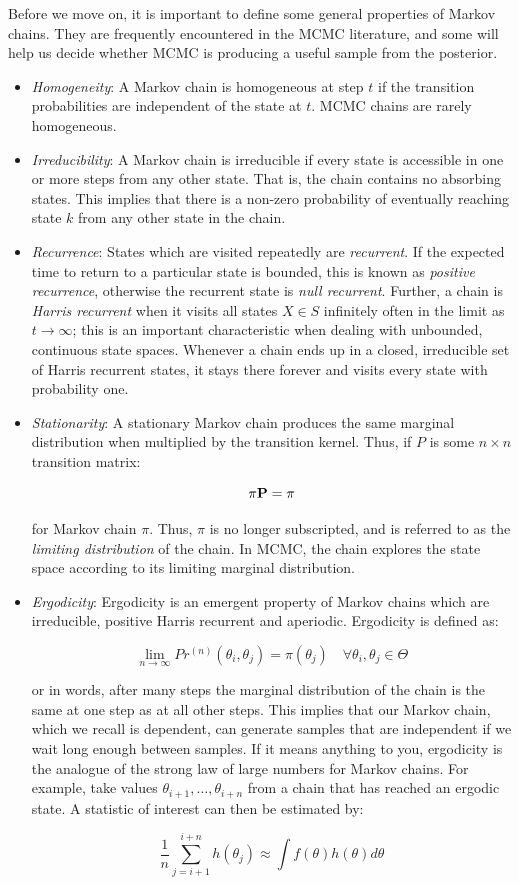 Before we move on, it is important to define some general properties of Markov chains. They are frequently encountered in the MCMC literature, and some will help us decide whether MCMC is producing a useful sample from the posterior.

\begin{itemize}
\item \emph{Homogeneity}: A Markov chain is homogeneous at step $t$ if the transition probabilities are independent of the state at $t$. MCMC chains are rarely homogeneous.
\item \emph{Irreducibility}: A Markov chain is irreducible if every state is accessible in one or more steps from any other state. That is, the chain contains no absorbing states. This implies that there is a non-zero probability of eventually reaching state $k$ from any other state in the chain.
\item \emph{Recurrence}: States which are visited repeatedly are \emph{recurrent}. If the expected time to return to a particular state is bounded, this is known as \emph{positive recurrence}, otherwise the recurrent state is \emph{null recurrent}. Further, a chain is \emph{Harris recurrent} when it visits all states $X \in S$ infinitely often in the limit as $t \to \infty$; this is an important characteristic when dealing with unbounded, continuous state spaces. Whenever a chain ends up in a closed, irreducible set of Harris recurrent states, it stays there forever and visits every state with probability one.
\item \emph{Stationarity}: A stationary Markov chain produces the same marginal distribution when multiplied by the transition kernel.  Thus, if $P$ is some $n \times n$ transition matrix:

\[{\bf \pi P} = {\bf \pi}\]

\noindent for Markov chain $\pi$. Thus, $\pi$ is no longer subscripted, and is referred to as the \emph{limiting distribution} of the chain. In MCMC, the chain explores the state space according to its limiting marginal distribution.
\item \emph{Ergodicity}: Ergodicity is an emergent property of Markov chains which are irreducible, positive Harris recurrent and aperiodic. Ergodicity is defined as:

\[
\lim_{n \to \infty} Pr^{(n)}(\theta_i,\theta_j) = \pi(\theta_j) \quad \forall \theta_i, \theta_j \in \Theta
\]

\noindent or in words, after many steps the marginal distribution of the chain is the same at one step as at all other steps. This implies that our Markov chain, which we recall is dependent, can generate samples that are independent if we wait long enough between samples. If it means anything to you, ergodicity is the analogue of the strong law of large numbers for Markov chains. For example, take values $\theta_{i+1},\ldots,\theta_{i+n}$ from a chain that has reached an ergodic state. A statistic of interest can then be estimated by:

\[
\frac{1}{n}\sum_{j=i+1}^{i+n} h(\theta_j) \approx \int f(\theta) h(\theta) d\theta
\]

\end{itemize}


